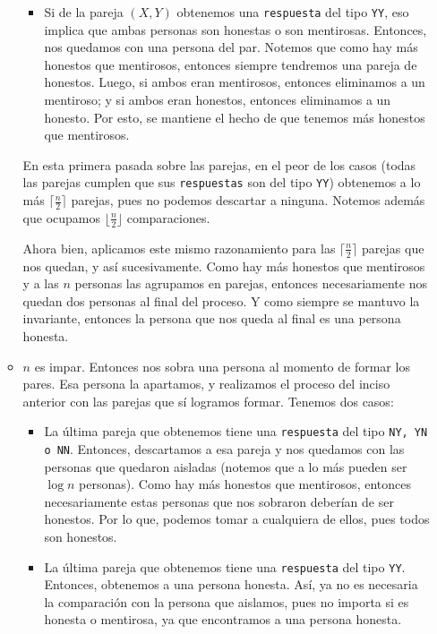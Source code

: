 \documentclass[letterpaper,11pt]{article}
\begin{document}
\begin{enumerate}
\begin{itemize}
\begin{itemize}
            \item Si de la pareja $(X,Y)$ obtenemos una \texttt{respuesta} del 
            tipo \texttt{YY}, eso implica que ambas personas son honestas o 
            son mentirosas. Entonces, nos quedamos con una persona del par. 
            Notemos que como hay más honestos que mentirosos, entonces siempre 
            tendremos una pareja de honestos. Luego, si ambos eran mentirosos, 
            entonces eliminamos a un mentiroso; y si ambos eran honestos, 
            entonces eliminamos a un honesto. Por esto, se mantiene el hecho 
            de que tenemos más honestos que mentirosos. 
        \end{itemize}

        En esta primera pasada sobre las parejas, en el peor de los casos 
        (todas las parejas cumplen que sus \texttt{respuestas} son del tipo 
        \texttt{YY}) obtenemos a lo más $\lceil \frac{n}{2} \rceil$ parejas, 
        pues no podemos descartar a ninguna. Notemos además que ocupamos  
        $\lfloor \frac{n}{2} \rfloor$ comparaciones. 
        
        Ahora bien, aplicamos este mismo razonamiento para las 
        $\lceil \frac{n}{2} \rceil$ parejas que nos quedan, y así sucesivamente.
        Como hay más honestos que mentirosos y a las $n$ personas las agrupamos 
        en parejas, entonces necesariamente nos quedan dos personas al final 
        del proceso. Y como siempre se mantuvo la invariante, entonces la persona 
        que nos queda al final es una persona honesta.  

        \item $n$ es impar. Entonces nos sobra una persona al momento de formar
        los pares. Esa persona la apartamos, y realizamos el proceso del inciso 
        anterior con las parejas que sí logramos formar. Tenemos dos casos:
        \begin{itemize}
            \item La última pareja que obtenemos tiene una \texttt{respuesta} 
            del tipo \texttt{NY, YN o NN}. Entonces, descartamos a esa pareja 
            y nos quedamos con las personas que quedaron aisladas (notemos 
            que a lo más pueden ser $\log n$ personas). Como hay más honestos 
            que mentirosos, entonces necesariamente estas personas que nos 
            sobraron deberían de ser honestos. Por lo que, podemos tomar a 
            cualquiera de ellos, pues todos son honestos.

            \item La última pareja que obtenemos tiene una \texttt{respuesta}
            del tipo \texttt{YY}. Entonces, obtenemos a una persona honesta.
            Así, ya no es necesaria la comparación con la persona que aislamos, 
            pues no importa si es honesta o mentirosa, ya que encontramos a una 
            persona honesta. 
        \end{itemize}
    \end{itemize}


\end{enumerate}
\end{document}
